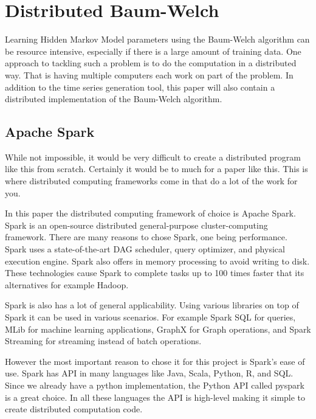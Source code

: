 
\chapter{Distributed Baum-Welch}\label{chapter:hmm-dist}

Learning Hidden Markov Model parameters using the Baum-Welch algorithm can be resource intensive, especially if there is a large amount of training data. One approach to tackling such a problem is to do the computation in a distributed way. That is having multiple computers each work on part of the problem. In addition to the time series generation tool, this paper will also contain a distributed implementation of the Baum-Welch algorithm. 

\section{Apache Spark}

While not impossible, it would be very difficult to create a distributed program like this from scratch. Certainly it would be to much for a paper like this. This is where distributed computing frameworks come in that do a lot of the work for you. 

In this paper the distributed computing framework of choice is Apache Spark. Spark is an open-source distributed general-purpose cluster-computing framework. There are many reasons to chose Spark, one being performance. Spark uses a state-of-the-art DAG scheduler, query optimizer, and physical execution engine. Spark also offers in memory processing to avoid writing to disk. These technologies cause Spark to complete tasks up to 100 times faster that its alternatives for example Hadoop. \parencite{zaharia2016apache}

Spark is also has a lot of general applicability. Using various libraries on top of Spark it can be used in various scenarios. For example Spark SQL for queries, MLib for machine learning applications, GraphX for Graph operations, and Spark Streaming for streaming instead of batch operations. 

However the most important reason to chose it for this project is Spark's ease of use. Spark has API in many languages like Java, Scala, Python, R, and SQL. Since we already have a python implementation, the Python API called pyspark is a great choice. In all these languages the API is high-level making it simple to create distributed computation code. \parencite{pyspark}

